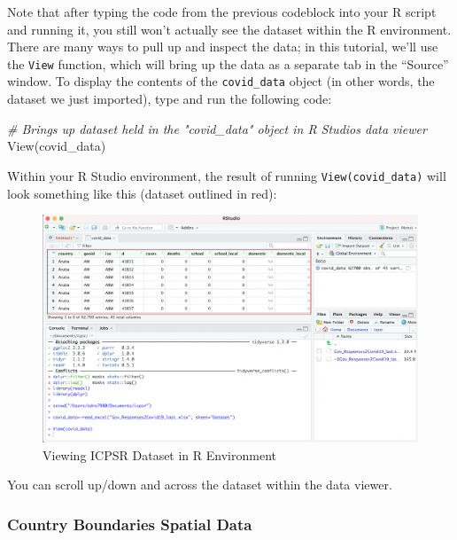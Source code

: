 \documentclass[
]{article}
\newenvironment{Shaded}{\begin{snugshade}}{\end{snugshade}}
\newcommand{\CommentTok}[1]{\textcolor[rgb]{0.56,0.35,0.01}{\textit{#1}}}
\newcommand{\FunctionTok}[1]{\textcolor[rgb]{0.00,0.00,0.00}{#1}}
\newcommand{\NormalTok}[1]{#1}
\begin{document}
Note that after typing the code from the previous codeblock into your R script and running it, you still won't actually see the dataset within the R environment. There are many ways to pull up and inspect the data; in this tutorial, we'll use the \texttt{View} function, which will bring up the data as a separate tab in the ``Source'' window. To display the contents of the \texttt{covid\_data} object (in other words, the dataset we just imported), type and run the following code:

\begin{Shaded}
\begin{Highlighting}[]
\CommentTok{\# Brings up dataset held in the "covid\_data" object in R Studio\textquotesingle{}s data viewer}
\FunctionTok{View}\NormalTok{(covid\_data)}
\end{Highlighting}
\end{Shaded}

Within your R Studio environment, the result of running \texttt{View(covid\_data)} will look something like this (dataset outlined in red):

\begin{figure}
\includegraphics[width=1\linewidth]{images/viewdata} \caption{Viewing ICPSR Dataset in R Environment}\label{fig:unnamed-chunk-14}
\end{figure}

You can scroll up/down and across the dataset within the data viewer.

\hypertarget{country-boundaries-spatial-data}{%
\subsubsection{Country Boundaries Spatial Data}\label{country-boundaries-spatial-data}}
\end{document}
